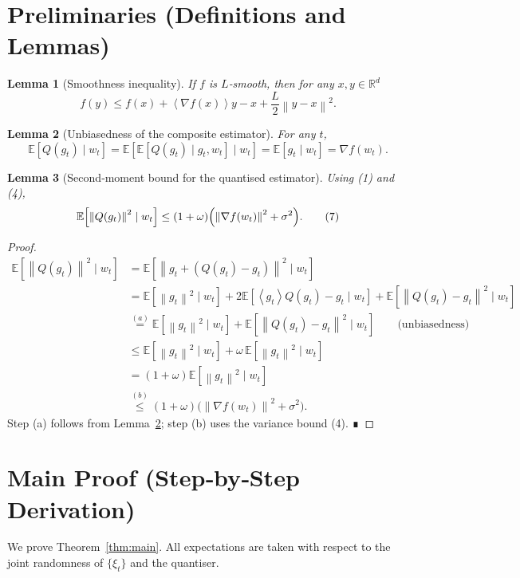 \documentclass{article}
\newtheorem{lemma}{Lemma}
\newcommand{\EE}{\mathbb{E}}
\newcommand{\RR}{\mathbb{R}}
\newcommand{\norm}[1]{\left\lVert#1\right\rVert}
\newcommand{\inner}[1]{\left\langle#1\right\rangle}
\begin{document}
\section*{Preliminaries (Definitions and Lemmas)}
\begin{lemma}[Smoothness inequality]\label{lem:smooth}
If $f$ is $L$‑smooth, then for any $x,y\in\RR^{d}$
\[
f(y)\le f(x)+\inner{\nabla f(x)}{y-x}+\frac{L}{2}\norm{y-x}^{2}.
\]
\end{lemma}
\begin{lemma}[Unbiasedness of the composite estimator]\label{lem:unbiased}
For any $t$,
\[
\EE\!\left[Q(g_t)\mid w_t\right]=\EE\!\left[\EE\!\left[Q(g_t)\mid g_t,w_t\right]\mid w_t\right]
      =\EE\!\left[g_t\mid w_t\right]=\nabla f(w_t).
\]
\end{lemma}
\begin{lemma}[Second‑moment bound for the quantised estimator]\label{lem:second}
Using (1) and (4),
\[
\EE\!\left[\norm{Q(g_t)}^{2}\mid w_t\right]
\le (1+\omega)\Bigl(\norm{\nabla f(w_t)}^{2}+\sigma^{2}\Bigr).
\tag{7}
\]
\end{lemma}
\begin{proof}
\begin{align*}
\EE\!\left[\norm{Q(g_t)}^{2}\mid w_t\right]
 &=\EE\!\left[\norm{g_t+(Q(g_t)-g_t)}^{2}\mid w_t\right]\\
 &=\EE\!\left[\norm{g_t}^{2}\mid w_t\right]
   +2\EE\!\left[\inner{g_t}{Q(g_t)-g_t}\mid w_t\right]
   +\EE\!\left[\norm{Q(g_t)-g_t}^{2}\mid w_t\right]\\
 &\overset{(a)}{=}\EE\!\left[\norm{g_t}^{2}\mid w_t\right]
   +\EE\!\left[\norm{Q(g_t)-g_t}^{2}\mid w_t\right] \qquad\text{(unbiasedness)}\\
 &\le\EE\!\left[\norm{g_t}^{2}\mid w_t\right]+\omega\,\EE\!\left[\norm{g_t}^{2}\mid w_t\right]\\
 &= (1+\omega)\EE\!\left[\norm{g_t}^{2}\mid w_t\right]\\
 &\overset{(b)}{\le}(1+\omega)\bigl(\norm{\nabla f(w_t)}^{2}+\sigma^{2}\bigr).
\end{align*}
Step (a) follows from Lemma~\ref{lem:unbiased}; step (b) uses the variance bound (4). ∎
\end{proof}

\section*{Main Proof (Step‑by‑Step Derivation)}
We prove Theorem~\ref{thm:main}. All expectations are taken with respect to the joint randomness of $\{\xi_t\}$ and the quantiser.
\end{document}
